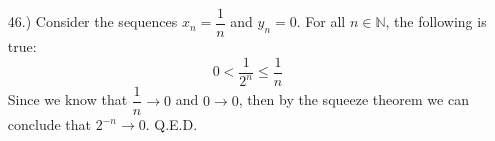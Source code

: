 \documentclass[12pt]{article}
\newcommand{\vertb}[1]{\left\vert#1\right\vert}
\begin{document}
\pagestyle{fancy}
\fancyhead{}

\normalsize
\begin{itemize}







    \item [46.)] Consider the sequences $x_n=\dfrac{1}{n}$ and $y_n=0$. For all $n\in\mathbb{N}$, the following is true:
    \[0<\frac{1}{2^n}\leq\frac{1}{n}\]
    Since we know that $\dfrac{1}{n}\to0$ and $0\to0$, then by the squeeze theorem we can conclude that $2^{-n}\to0$. Q.E.D.


\end{itemize}
\end{document}

